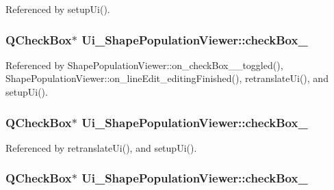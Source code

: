 Referenced by setup\-Ui().

\hypertarget{class_ui___shape_population_viewer_a9987cfb8cc28c513d88fd4fda358172f}{
\subsubsection[{check\-Box\-\_\-10}]{\setlength{\rightskip}{0pt plus 5cm}Q\-Check\-Box$\ast$ Ui\-\_\-\-Shape\-Population\-Viewer\-::check\-Box\-\_}}\label{class_ui___shape_population_viewer_a9987cfb8cc28c513d88fd4fda358172f}


Referenced by Shape\-Population\-Viewer\-::on\-\_\-check\-Box\-\_\-\_\-toggled(), Shape\-Population\-Viewer\-::on\-\_\-line\-Edit\-\_\-editing\-Finished(), retranslate\-Ui(), and setup\-Ui().

\hypertarget{class_ui___shape_population_viewer_a82b0e1935224c286d02c933847bb539f}{
\subsubsection[{check\-Box\-\_\-3}]{\setlength{\rightskip}{0pt plus 5cm}Q\-Check\-Box$\ast$ Ui\-\_\-\-Shape\-Population\-Viewer\-::check\-Box\-\_}}\label{class_ui___shape_population_viewer_a82b0e1935224c286d02c933847bb539f}


Referenced by retranslate\-Ui(), and setup\-Ui().

\hypertarget{class_ui___shape_population_viewer_a1d0b21459e70bf50df0d7b096584baaf}{
\subsubsection[{check\-Box\-\_\-9}]{\setlength{\rightskip}{0pt plus 5cm}Q\-Check\-Box$\ast$ Ui\-\_\-\-Shape\-Population\-Viewer\-::check\-Box\-\_}}\label{class_ui___shape_population_viewer_a1d0b21459e70bf50df0d7b096584baaf}


